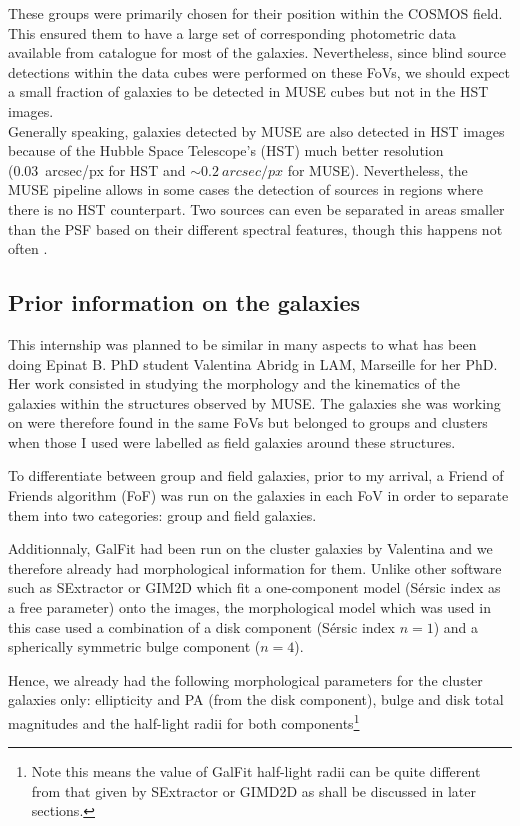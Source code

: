 These groups were primarily chosen for their position within the COSMOS field. This ensured them to have a large set of corresponding photometric data available from  catalogue for most of the galaxies. Nevertheless, since blind source detections within the data cubes were performed on these FoVs, we should expect a small fraction of galaxies to be detected in MUSE cubes but not in the HST images.\\

Generally speaking, galaxies detected by MUSE are also detected in HST images because of the Hubble Space Telescope's (HST) much better resolution (\SI{0.03}{arcsec/px} for HST and $\sim \SI{0.2}{arcsec/px}$ for MUSE). Nevertheless, the MUSE pipeline allows in some cases the detection of sources in regions where there is no HST counterpart. Two sources can even be separated in areas smaller than the PSF based on their different spectral features, though this happens not often .

\subsection{Prior information on the galaxies}

This internship was planned to be similar in many aspects to what has been doing Epinat B. PhD student Valentina Abridg in LAM, Marseille for her PhD. Her work consisted in studying the morphology and the kinematics of the galaxies within the structures observed by MUSE. The galaxies she was working on were therefore found in the same FoVs but belonged to groups and clusters when those I used were labelled as field galaxies around these structures. 

To differentiate between group and field galaxies, prior to my arrival, a Friend of Friends algorithm (FoF) was run on the galaxies in each FoV in order to separate them into two categories: group and field galaxies.

Additionnaly, GalFit had been run on the cluster galaxies by Valentina and we therefore already had morphological information for them.
Unlike other software such as SExtractor or GIM2D which fit a one-component model (Sérsic index as a free parameter) onto the images, the morphological model which was used in this case used a combination of a disk component (Sérsic index $n=1$) and a spherically symmetric bulge component ($n=4$). 

Hence, we already had the following morphological parameters for the cluster galaxies only: ellipticity and PA (from the disk component), bulge and disk total magnitudes and the half-light radii for both components\footnote{Note this means the value of GalFit half-light radii can be quite different from that given by SExtractor or GIMD2D as shall be discussed in later sections. }


